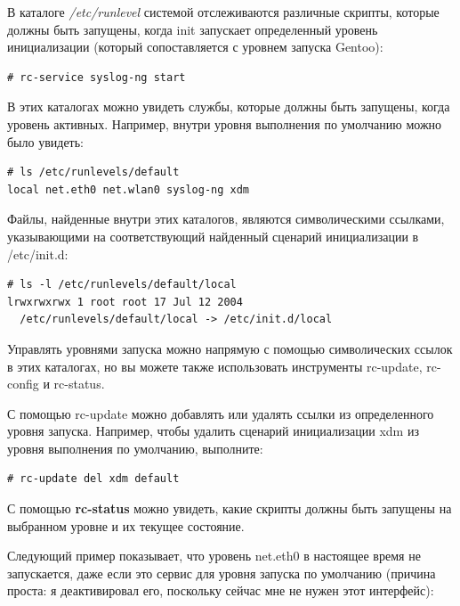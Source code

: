 \documentclass[10pt]{book}
\begin{document}
В каталоге \textit{/etc/runlevel} системой отслеживаются различные
скрипты, которые должны быть запущены, когда init запускает определенный
уровень инициализации (который сопоставляется с уровнем запуска Gentoo):

\begin{tcolorbox} 
\begin{lstlisting}
# rc-service syslog-ng start
\end{lstlisting}
\end{tcolorbox}

В этих каталогах можно увидеть службы, которые должны быть запущены,
когда уровень активных. Например, внутри уровня выполнения по умолчанию
можно было увидеть:

\begin{tcolorbox} 
\begin{lstlisting}
# ls /etc/runlevels/default
local net.eth0 net.wlan0 syslog-ng xdm
\end{lstlisting}
\end{tcolorbox}

Файлы, найденные внутри этих каталогов, являются символическими ссылками,
указывающими на соответствующий найденный сценарий инициализации в
/etc/init.d: \begin{tcolorbox} 
\begin{lstlisting}
# ls -l /etc/runlevels/default/local
lrwxrwxrwx 1 root root 17 Jul 12 2004
  /etc/runlevels/default/local -> /etc/init.d/local
\end{lstlisting}
\end{tcolorbox}

Управлять уровнями запуска можно напрямую с помощью символических
ссылок в этих каталогах, но вы можете также использовать инструменты
rc-update, rc-config и rc-status.

С помощью rc-update можно добавлять или удалять ссылки из определенного
уровня запуска. Например, чтобы удалить сценарий инициализации xdm
из уровня выполнения по умолчанию, выполните: \begin{tcolorbox} 
\begin{lstlisting}
# rc-update del xdm default
\end{lstlisting}
\end{tcolorbox}

С помощью \textbf{rc-status} можно увидеть, какие скрипты должны быть
запущены на выбранном уровне и их текущее состояние.

Следующий пример показывает, что уровень net.eth0 в настоящее время
не запускается, даже если это сервис для уровня запуска по умолчанию
(причина проста: я деактивировал его, поскольку сейчас мне не нужен
этот интерфейс):
\end{document}
